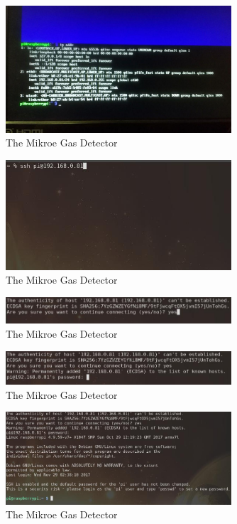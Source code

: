 \documentclass[11pt]{report}
\begin{document}
		\begin{figure}[ht]
			\centering
			\includegraphics[width=0.75\textwidth]{images/pi/get_ip.jpg} 
			\caption{The Mikroe Gas Detector}
		\end{figure}

		\begin{figure}[ht]
			\centering
			\includegraphics[width=0.75\textwidth]{images/pi/login_ssh_nix.jpg} 
			\caption{The Mikroe Gas Detector}
		\end{figure}

		\begin{figure}[ht]
			\centering
			\includegraphics[width=0.75\textwidth]{images/pi/login_ssh_nix_2.jpg} 
			\caption{The Mikroe Gas Detector}
		\end{figure}

		\begin{figure}[ht]
			\centering
			\includegraphics[width=0.75\textwidth]{images/pi/login_ssh_nix_3.jpg} 
			\caption{The Mikroe Gas Detector}
		\end{figure}

		\begin{figure}[ht]
			\centering
			\includegraphics[width=0.75\textwidth]{images/pi/login_ssh_nix_4.jpg} 
			\caption{The Mikroe Gas Detector}
		\end{figure}
\end{document}
